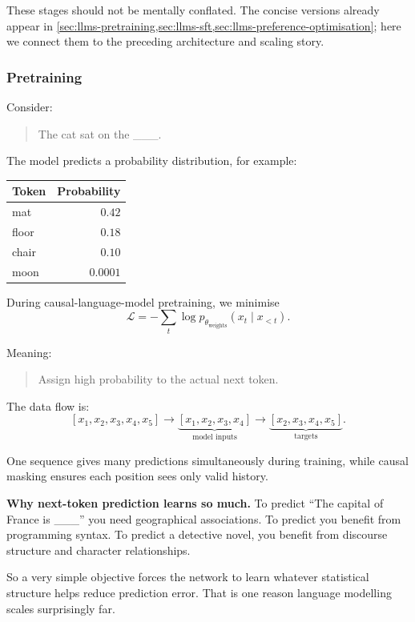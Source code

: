 These stages should not be mentally conflated.
The concise versions already appear in \cref{sec:llms-pretraining,sec:llms-sft,sec:llms-preference-optimisation}; here we connect them to the preceding architecture and scaling story.

\subsubsection{Pretraining}
\label{subsec:modern-pretraining}
Consider:
\begin{quote}
The cat sat on the \_\_\_.
\end{quote}

The model predicts a probability distribution, for example:
\begin{center}
\small
\begin{tabular}{lr}
\toprule
Token & Probability \\
\midrule
mat & $0.42$ \\
floor & $0.18$ \\
chair & $0.10$ \\
moon & $0.0001$ \\
\bottomrule
\end{tabular}
\end{center}

During causal-language-model pretraining, we minimise
\[
\mathcal L
=
-\sum_t
\log p_{\theta_{\text{weights}}}(x_t\mid x_{<t}).
\]

Meaning:

\begin{quote}
Assign high probability to the actual next token.
\end{quote}

The data flow is:
\[
[x_1,x_2,x_3,x_4,x_5]
\rightarrow
\underbrace{[x_1,x_2,x_3,x_4]}_{\text{model inputs}}
\rightarrow
\underbrace{[x_2,x_3,x_4,x_5]}_{\text{targets}}.
\]

One sequence gives many predictions simultaneously during training, while causal masking ensures each position sees only valid history.

\textbf{Why next-token prediction learns so much.}
To predict ``The capital of France is \_\_\_'' you need geographical associations.
To predict  you benefit from programming syntax.
To predict a detective novel, you benefit from discourse structure and character relationships.

So a very simple objective forces the network to learn whatever statistical structure helps reduce prediction error.
That is one reason language modelling scales surprisingly far.

